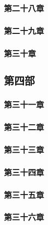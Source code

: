\subsubsection{第二十八章}



\subsubsection{第二十九章}



\subsubsection{第三十章}



\subsection{第四部}



\subsubsection{第三十一章}



\subsubsection{第三十二章}



\subsubsection{第三十三章}



\subsubsection{第三十四章}



\subsubsection{第三十五章}



\subsubsection{第三十六章}



